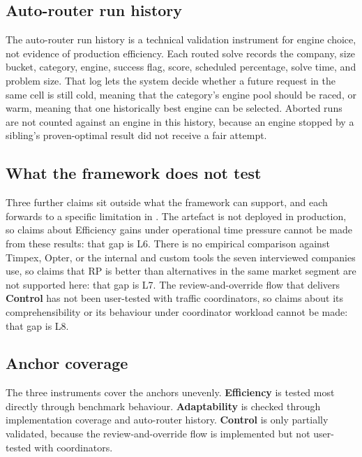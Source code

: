 \subsection{Auto-router run history}
\label{sec:eval-auto-router}

The auto-router run history is a technical validation instrument for engine choice, not evidence of production efficiency. Each routed solve records the company, size bucket, category, engine, success flag, score, scheduled percentage, solve time, and problem size. That log lets the system decide whether a future request in the same cell is still cold, meaning that the category's engine pool should be raced, or warm, meaning that one historically best engine can be selected. Aborted runs are not counted against an engine in this history, because an engine stopped by a sibling's proven-optimal result did not receive a fair attempt.

\subsection{What the framework does not test}
\label{sec:eval-bounds}

Three further claims sit outside what the framework can support, and each forwards to a specific limitation in . The artefact is not deployed in production, so claims about Efficiency gains under operational time pressure cannot be made from these results: that gap is L6. There is no empirical comparison against Timpex, Opter, or the internal and custom tools the seven interviewed companies use, so claims that RP is better than alternatives in the same market segment are not supported here: that gap is L7. The review-and-override flow that delivers \textbf{Control} has not been user-tested with traffic coordinators, so claims about its comprehensibility or its behaviour under coordinator workload cannot be made: that gap is L8.

\subsection{Anchor coverage}
\label{sec:eval-anchor-coverage}

The three instruments cover the anchors unevenly. \textbf{Efficiency} is tested most directly through benchmark behaviour. \textbf{Adaptability} is checked through implementation coverage and auto-router history. \textbf{Control} is only partially validated, because the review-and-override flow is implemented but not user-tested with coordinators.

